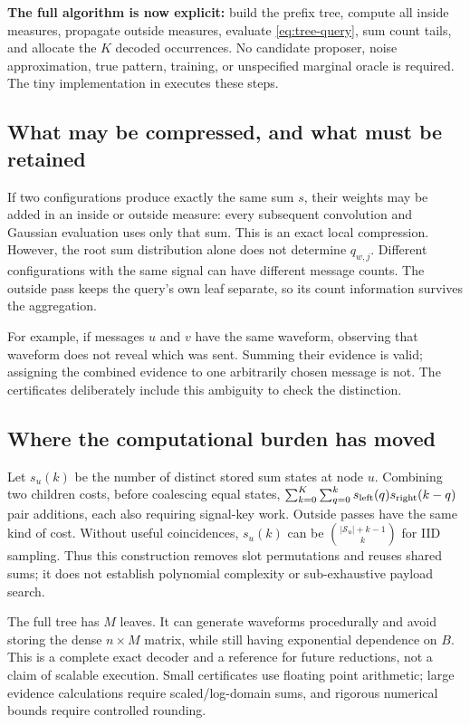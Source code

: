 \documentclass[10pt,a4paper]{article}
\begin{document}
\textbf{The full algorithm is now explicit:} build the prefix tree, compute all inside measures, propagate
outside measures, evaluate \eqref{eq:tree-query}, sum count tails, and allocate the $K$ decoded occurrences.
No candidate proposer, noise approximation, true pattern, training, or unspecified marginal oracle is required.
The tiny implementation in  executes these steps.

\subsection{What may be compressed, and what must be retained}
If two configurations produce exactly the same sum $s$, their weights may be added in an inside or outside
measure: every subsequent convolution and Gaussian evaluation uses only that sum.
This is an exact local compression. However, the root sum distribution alone does not determine $q_{w,j}$.
Different configurations with the same signal can have different message counts. The outside pass keeps the
query's own leaf separate, so its count information survives the aggregation.

For example, if messages $u$ and $v$ have the same waveform, observing that waveform does not reveal which was
sent. Summing their evidence is valid; assigning the combined evidence to one arbitrarily chosen message is not.
The certificates deliberately include this ambiguity to check the distinction.

\subsection{Where the computational burden has moved}
Let $s_u(k)$ be the number of distinct stored sum states at node $u$. Combining two children costs, before
coalescing equal states,
$\sum_{k=0}^K\sum_{q=0}^k s_{\rm left}(q)s_{\rm right}(k-q)$ pair additions,
each also requiring signal-key work. Outside passes have the same kind of cost.
Without useful coincidences, $s_u(k)$ can be $\binom{|\mathcal S_u|+k-1}{k}$ for IID sampling.
Thus this construction removes slot permutations and reuses shared sums; it does not establish polynomial
complexity or sub-exhaustive payload search.

The full tree has $M$ leaves. It can generate waveforms procedurally and avoid storing the dense $n\times M$
matrix, while still having exponential dependence on $B$. This is a complete exact decoder and a reference
for future reductions, not a claim of scalable execution. Small certificates use floating point arithmetic;
large evidence calculations require scaled/log-domain sums, and rigorous numerical bounds require controlled rounding.
\end{document}
